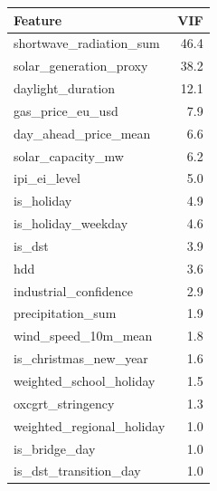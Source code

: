 \begin{tabular}{lr}
\toprule
Feature & VIF \\
\midrule
shortwave\_radiation\_sum & 46.4 \\
solar\_generation\_proxy & 38.2 \\
daylight\_duration & 12.1 \\
gas\_price\_eu\_usd & 7.9 \\
day\_ahead\_price\_mean & 6.6 \\
solar\_capacity\_mw & 6.2 \\
ipi\_ei\_level & 5.0 \\
is\_holiday & 4.9 \\
is\_holiday\_weekday & 4.6 \\
is\_dst & 3.9 \\
hdd & 3.6 \\
industrial\_confidence & 2.9 \\
precipitation\_sum & 1.9 \\
wind\_speed\_10m\_mean & 1.8 \\
is\_christmas\_new\_year & 1.6 \\
weighted\_school\_holiday & 1.5 \\
oxcgrt\_stringency & 1.3 \\
weighted\_regional\_holiday & 1.0 \\
is\_bridge\_day & 1.0 \\
is\_dst\_transition\_day & 1.0 \\
\bottomrule
\end{tabular}
